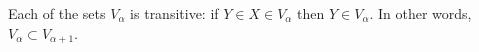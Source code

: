 Each of the sets $V_{\alpha}$ is transitive: if $Y \in X \in V_{\alpha}$ then $Y \in V_{\alpha}$. In other words, $V_{\alpha} \subset V_{\alpha+1}$.
